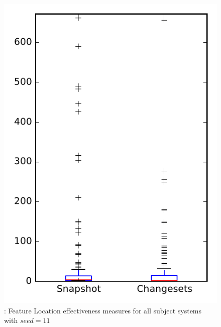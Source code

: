 
\begin{figure}
\centering
\includegraphics[height=0.4\textheight]{figures/flt_seed/rq1_overview_11}
\caption{\rone: Feature Location effectiveness measures for all subject systems with $seed=11$}
\label{fig:flt_seed:rq1:overview}
\end{figure}
